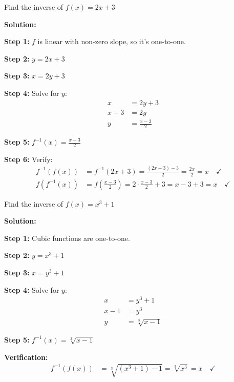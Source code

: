\documentclass[12pt,a4paper]{article}
\begin{document}
\begin{example}
Find the inverse of $f(x) = 2x + 3$

\textbf{Solution:}

\textbf{Step 1:} $f$ is linear with non-zero slope, so it's one-to-one.

\textbf{Step 2:} $y = 2x + 3$

\textbf{Step 3:} $x = 2y + 3$

\textbf{Step 4:} Solve for $y$:
\begin{align*}
x &= 2y + 3 \\
x - 3 &= 2y \\
y &= \frac{x - 3}{2}
\end{align*}

\textbf{Step 5:} $f^{-1}(x) = \frac{x - 3}{2}$

\textbf{Step 6:} Verify:
\begin{align*}
f^{-1}(f(x)) &= f^{-1}(2x + 3) = \frac{(2x+3) - 3}{2} = \frac{2x}{2} = x \quad \checkmark \\
f(f^{-1}(x)) &= f\left(\frac{x-3}{2}\right) = 2 \cdot \frac{x-3}{2} + 3 = x - 3 + 3 = x \quad \checkmark
\end{align*}
\end{example}

\begin{example}
Find the inverse of $f(x) = x^3 + 1$

\textbf{Solution:}

\textbf{Step 1:} Cubic functions are one-to-one.

\textbf{Step 2:} $y = x^3 + 1$

\textbf{Step 3:} $x = y^3 + 1$

\textbf{Step 4:} Solve for $y$:
\begin{align*}
x &= y^3 + 1 \\
x - 1 &= y^3 \\
y &= \sqrt[3]{x - 1}
\end{align*}

\textbf{Step 5:} $f^{-1}(x) = \sqrt[3]{x - 1}$

\textbf{Verification:}
\begin{align*}
f^{-1}(f(x)) &= \sqrt[3]{(x^3 + 1) - 1} = \sqrt[3]{x^3} = x \quad \checkmark
\end{align*}
\end{example}
\end{document}
